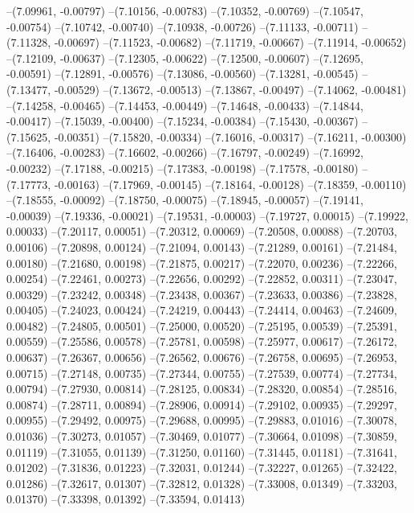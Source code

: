 --(7.09961, -0.00797)
--(7.10156, -0.00783)
--(7.10352, -0.00769)
--(7.10547, -0.00754)
--(7.10742, -0.00740)
--(7.10938, -0.00726)
--(7.11133, -0.00711)
--(7.11328, -0.00697)
--(7.11523, -0.00682)
--(7.11719, -0.00667)
--(7.11914, -0.00652)
--(7.12109, -0.00637)
--(7.12305, -0.00622)
--(7.12500, -0.00607)
--(7.12695, -0.00591)
--(7.12891, -0.00576)
--(7.13086, -0.00560)
--(7.13281, -0.00545)
--(7.13477, -0.00529)
--(7.13672, -0.00513)
--(7.13867, -0.00497)
--(7.14062, -0.00481)
--(7.14258, -0.00465)
--(7.14453, -0.00449)
--(7.14648, -0.00433)
--(7.14844, -0.00417)
--(7.15039, -0.00400)
--(7.15234, -0.00384)
--(7.15430, -0.00367)
--(7.15625, -0.00351)
--(7.15820, -0.00334)
--(7.16016, -0.00317)
--(7.16211, -0.00300)
--(7.16406, -0.00283)
--(7.16602, -0.00266)
--(7.16797, -0.00249)
--(7.16992, -0.00232)
--(7.17188, -0.00215)
--(7.17383, -0.00198)
--(7.17578, -0.00180)
--(7.17773, -0.00163)
--(7.17969, -0.00145)
--(7.18164, -0.00128)
--(7.18359, -0.00110)
--(7.18555, -0.00092)
--(7.18750, -0.00075)
--(7.18945, -0.00057)
--(7.19141, -0.00039)
--(7.19336, -0.00021)
--(7.19531, -0.00003)
--(7.19727, 0.00015)
--(7.19922, 0.00033)
--(7.20117, 0.00051)
--(7.20312, 0.00069)
--(7.20508, 0.00088)
--(7.20703, 0.00106)
--(7.20898, 0.00124)
--(7.21094, 0.00143)
--(7.21289, 0.00161)
--(7.21484, 0.00180)
--(7.21680, 0.00198)
--(7.21875, 0.00217)
--(7.22070, 0.00236)
--(7.22266, 0.00254)
--(7.22461, 0.00273)
--(7.22656, 0.00292)
--(7.22852, 0.00311)
--(7.23047, 0.00329)
--(7.23242, 0.00348)
--(7.23438, 0.00367)
--(7.23633, 0.00386)
--(7.23828, 0.00405)
--(7.24023, 0.00424)
--(7.24219, 0.00443)
--(7.24414, 0.00463)
--(7.24609, 0.00482)
--(7.24805, 0.00501)
--(7.25000, 0.00520)
--(7.25195, 0.00539)
--(7.25391, 0.00559)
--(7.25586, 0.00578)
--(7.25781, 0.00598)
--(7.25977, 0.00617)
--(7.26172, 0.00637)
--(7.26367, 0.00656)
--(7.26562, 0.00676)
--(7.26758, 0.00695)
--(7.26953, 0.00715)
--(7.27148, 0.00735)
--(7.27344, 0.00755)
--(7.27539, 0.00774)
--(7.27734, 0.00794)
--(7.27930, 0.00814)
--(7.28125, 0.00834)
--(7.28320, 0.00854)
--(7.28516, 0.00874)
--(7.28711, 0.00894)
--(7.28906, 0.00914)
--(7.29102, 0.00935)
--(7.29297, 0.00955)
--(7.29492, 0.00975)
--(7.29688, 0.00995)
--(7.29883, 0.01016)
--(7.30078, 0.01036)
--(7.30273, 0.01057)
--(7.30469, 0.01077)
--(7.30664, 0.01098)
--(7.30859, 0.01119)
--(7.31055, 0.01139)
--(7.31250, 0.01160)
--(7.31445, 0.01181)
--(7.31641, 0.01202)
--(7.31836, 0.01223)
--(7.32031, 0.01244)
--(7.32227, 0.01265)
--(7.32422, 0.01286)
--(7.32617, 0.01307)
--(7.32812, 0.01328)
--(7.33008, 0.01349)
--(7.33203, 0.01370)
--(7.33398, 0.01392)
--(7.33594, 0.01413)
